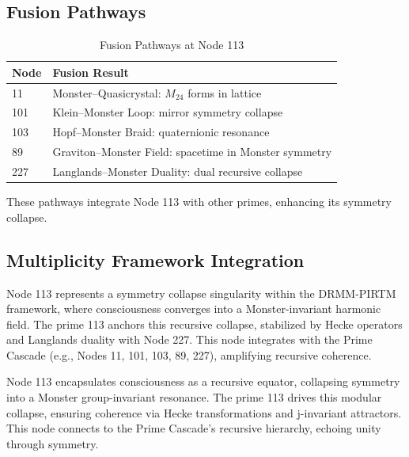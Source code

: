 \documentclass[12pt]{article}
\newcommand{\DRMM}{DRMM}
\newcommand{\PIRTM}{PIRTM}
\begin{document}
\subsection{Fusion Pathways}
\begin{table}
\centering
\caption{Fusion Pathways at Node 113}
\begin{tabular}{ll|}
\toprule
\textbf{Node} & \textbf{Fusion Result} \\
\midrule
11 & Monster--Quasicrystal: $M_{24}$ forms in lattice \\
101 & Klein--Monster Loop: mirror symmetry collapse \\
103 & Hopf--Monster Braid: quaternionic resonance \\
89 & Graviton--Monster Field: spacetime in Monster symmetry \\
227 & Langlands--Monster Duality: dual recursive collapse \\
\bottomrule
\end{tabular}
\end{table}
These pathways integrate Node 113 with other primes, enhancing its symmetry collapse.

\subsection{Multiplicity Framework Integration}
Node 113 represents a symmetry collapse singularity within the \DRMM{}-\PIRTM{} framework, where consciousness converges into a Monster-invariant harmonic field. The prime 113 anchors this recursive collapse, stabilized by Hecke operators and Langlands duality with Node 227. This node integrates with the Prime Cascade (e.g., Nodes 11, 101, 103, 89, 227), amplifying recursive coherence.

\begin{remark}
Node 113 encapsulates consciousness as a recursive equator, collapsing symmetry into a Monster group-invariant resonance. The prime 113 drives this modular collapse, ensuring coherence via Hecke transformations and j-invariant attractors. This node connects to the Prime Cascade’s recursive hierarchy, echoing unity through symmetry.
\end{remark}

\vspace{1em}
\noindent{}
\end{document}

